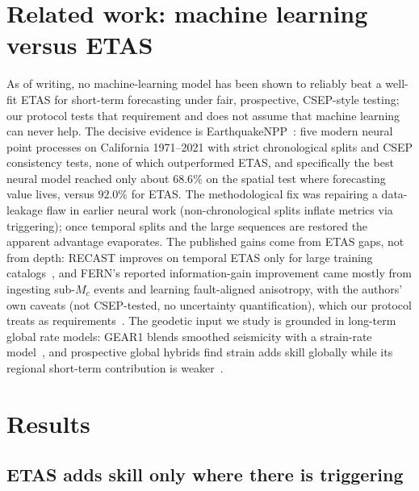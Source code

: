 \documentclass[journal]{IEEEtran}
\begin{document}
\section{Related work: machine learning versus ETAS}
\label{sec:related}

As of writing, no machine-learning model has been shown to reliably beat a well-fit ETAS
for short-term forecasting under fair, prospective, CSEP-style testing; our protocol tests
that requirement and does not assume that machine learning can never help. The decisive evidence is
EarthquakeNPP~\cite{stockman2026}: five modern neural point processes on California
1971--2021 with strict chronological splits and CSEP consistency tests, none of which
outperformed ETAS, and specifically the best neural model reached only about $68.6\%$ on the
spatial test where forecasting value lives, versus $92.0\%$ for ETAS. The methodological fix
was repairing a data-leakage flaw in earlier neural work (non-chronological splits inflate
metrics via triggering); once temporal splits and the large sequences are restored the
apparent advantage evaporates. The published gains come from ETAS gaps, not from depth:
RECAST improves on temporal ETAS only for large training catalogs~\cite{dascher2023}, and
FERN's reported information-gain improvement came mostly from ingesting sub-$M_c$ events and
learning fault-aligned anisotropy, with the authors' own caveats (not CSEP-tested, no
uncertainty quantification), which our protocol treats as requirements~\cite{zlydenko2023}. The geodetic input we study
is grounded in long-term global rate models: GEAR1 blends smoothed seismicity with a
strain-rate model~\cite{bird2015}, and prospective global hybrids find strain adds skill
globally while its regional short-term contribution is weaker~\cite{bayona2022}.

\section{Results}
\label{sec:results}

\subsection{ETAS adds skill only where there is triggering}
\label{sec:bias}
\end{document}
